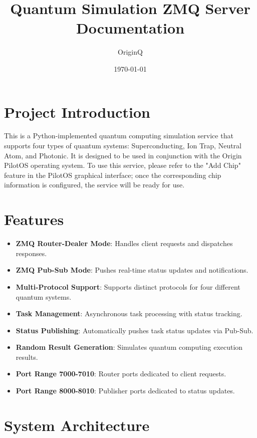 \documentclass[UTF8, a4paper, 12pt]{article}
\title{\textbf{Quantum Simulation ZMQ Server Documentation}}
\author{OriginQ}
\date{\today}
\begin{document}
\maketitle
\tableofcontents
\newpage

\section{Project Introduction}

This is a Python-implemented quantum computing simulation service that supports four types of quantum systems: Superconducting, Ion Trap, Neutral Atom, and Photonic. It is designed to be used in conjunction with the Origin PilotOS operating system. To use this service, please refer to the "Add Chip" feature in the PilotOS graphical interface; once the corresponding chip information is configured, the service will be ready for use.

\section{Features}

\begin{itemize}
    \item \textbf{ZMQ Router-Dealer Mode}: Handles client requests and dispatches responses.
    \item \textbf{ZMQ Pub-Sub Mode}: Pushes real-time status updates and notifications.
    \item \textbf{Multi-Protocol Support}: Supports distinct protocols for four different quantum systems.
    \item \textbf{Task Management}: Asynchronous task processing with status tracking.
    \item \textbf{Status Publishing}: Automatically pushes task status updates via Pub-Sub.
    \item \textbf{Random Result Generation}: Simulates quantum computing execution results.
    \item \textbf{Port Range 7000-7010}: Router ports dedicated to client requests.
    \item \textbf{Port Range 8000-8010}: Publisher ports dedicated to status updates.
\end{itemize}

\section{System Architecture}
\end{document}
